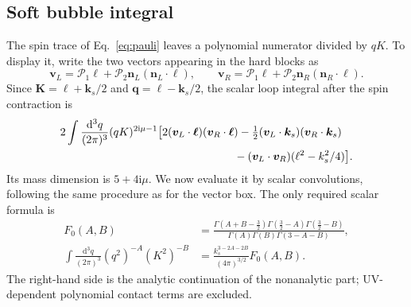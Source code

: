\documentclass[a4paper,12pt]{article}
\newcommand{\ii}{\mathrm i}
\newcommand{\dd}{\mathrm d}
\newcommand{\bq}{\bm q}
\newcommand{\bk}{\bm k}
\begin{document}
\subsection{Soft bubble integral}
The spin trace of Eq.~\eqref{eq:pauli} leaves a polynomial numerator divided
by $qK$. To display it, write the two vectors appearing in the hard blocks as
\begin{equation}
 \bm v_L=\mathcal P_1\bm\ell+\mathcal P_2\bm n_L(\bm n_L\cdot\bm\ell),\qquad
 \bm v_R=\mathcal P_1\bm\ell+\mathcal P_2\bm n_R(\bm n_R\cdot\bm\ell).
\end{equation}
Since $\bm K=\bm\ell+\bk_s/2$ and $\bq=\bm\ell-\bk_s/2$, the scalar loop
integral after the spin contraction is
\begin{align}
 &2\int\frac{\dd^3q}{(2\pi)^3}(qK)^{2\ii\mu-1}
 \big[2(\bm v_L\cdot\bm\ell)(\bm v_R\cdot\bm\ell)
 -\tfrac12(\bm v_L\cdot\bk_s)(\bm v_R\cdot\bk_s)\nonumber\\
 &\hspace{55mm}-(\bm v_L\cdot\bm v_R)(\ell^2-k_s^2/4)\big].
 \label{eq:spin-bubble}
\end{align}
Its mass dimension is $5+4\ii\mu$. We now evaluate it by scalar convolutions,
following the same procedure as for the vector box. The only required scalar
formula is
\begin{align}
 F_0(A,B)&=\frac{\Gamma(A+B-\tfrac32)\Gamma(\tfrac32-A)\Gamma(\tfrac32-B)}
 {\Gamma(A)\Gamma(B)\Gamma(3-A-B)},\\
 \int\frac{\dd^3q}{(2\pi)^3}(q^2)^{-A}(K^2)^{-B}
 &=\frac{k_s^{3-2A-2B}}{(4\pi)^{3/2}}F_0(A,B).
 \label{eq:scalar-bubble}
\end{align}
The right-hand side is the analytic continuation of the nonanalytic part;
UV-dependent polynomial contact terms are excluded.
\end{document}
